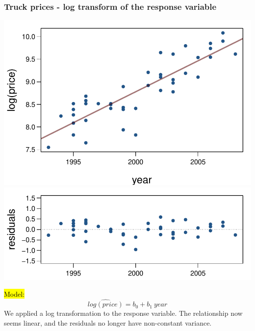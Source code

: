 \documentclass[slidestop,compress,mathserif,12pt,t,professionalfonts,xcolor=table]{beamer}
\begin{document}
\begin{frame}
\frametitle{Truck prices - log transform of the response variable}

\vspace{-0.25cm}

{
\begin{center}
\includegraphics[width=\textwidth]{figures/pickup/pu_price_year_scat_log} \\
\includegraphics[width=\textwidth]{figures/pickup/pu_price_year_res_log}
\end{center}
}
{
\hl{Model:} \[ \widehat{log(price)} = b_0 + b_1~year \]
\pause
We applied a log transformation to the response variable. The relationship now seems linear, and the residuals no longer have non-constant variance.
}

\end{frame}

\end{document}

